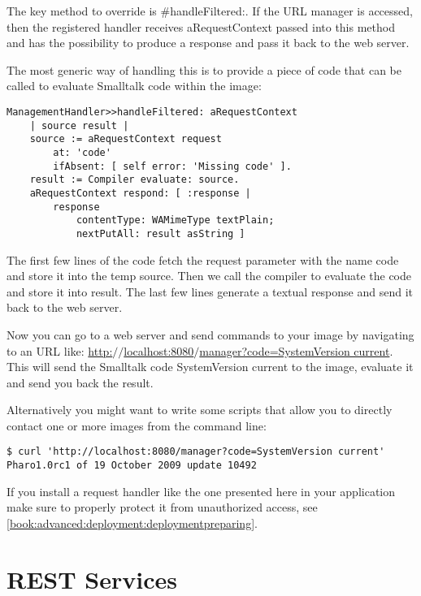 \documentclass[a4paper,10pt,twoside]{book}
\newcommand{\ct}[1]{{\small\ttfamily\textup{#1}}}
\begin{document}
 The key method to override is \ct{\#handleFiltered:}. If the URL \ct{manager} is accessed, then the registered handler receives \ct{aRequestContext} passed into this method and has the possibility to produce a response and pass it back to the web server.

The most generic way of handling this is to provide a piece of code that can be called to evaluate Smalltalk code within the image:

\begin{lstlisting}
ManagementHandler>>handleFiltered: aRequestContext
    | source result |
    source := aRequestContext request
        at: 'code'
        ifAbsent: [ self error: 'Missing code' ].
    result := Compiler evaluate: source.
    aRequestContext respond: [ :response |
        response
            contentType: WAMimeType textPlain;
            nextPutAll: result asString ]
\end{lstlisting}

The first few lines of the code fetch the request parameter with the name code and store it into the temp \ct{source}. Then we call the compiler to evaluate the code and store it into \ct{result}. The last few lines generate a textual response and send it back to the web server.

Now you can go to a web server and send commands to your image by navigating to an URL like: \href{http://localhost:8080/manager?code=SystemVersion current}{http:$/$$/$localhost:8080$/$manager?code=SystemVersion current}. This will send the Smalltalk code \ct{SystemVersion current} to the image, evaluate it and send you back the result.

Alternatively you might want to write some scripts that allow you to directly contact one or more images from the command line:

\begin{lstlisting}
$ curl 'http://localhost:8080/manager?code=SystemVersion current'
Pharo1.0rc1 of 19 October 2009 update 10492
\end{lstlisting}

If you install a request handler like the one presented here in your application make sure to properly protect it from unauthorized access, see \autoref{book:advanced:deployment:deploymentpreparing}.

\chapter{REST Services}
\label{book:advanced:restful}
\end{document}
